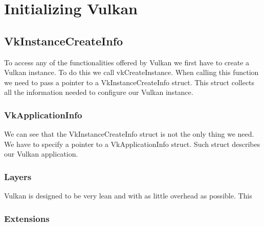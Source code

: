 \chapter{Initializing Vulkan}

\section{VkInstanceCreateInfo}

To access any of the functionalities offered by Vulkan we first have to create a Vulkan instance.
To do this we call vkCreateInstance.
When calling this function we need to pass a pointer to a VkInstanceCreateInfo struct.
This struct collects all the information needed to configure our Vulkan instance.

\begin{minipage}{\linewidth}{\noindent}

\end{minipage}

\subsection{VkApplicationInfo}

We can see that the VkInstanceCreateInfo struct is not the only thing we need.
We have to specify a pointer to a VkApplicationInfo struct. Such struct describes
our Vulkan application.

\begin{minipage}{\linewidth}{\noindent}
    
\end{minipage}

\subsection{Layers}

Vulkan is designed to be very lean and with as little overhead as possible.
This


\subsection{Extensions}
